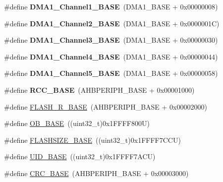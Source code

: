 \begin{DoxyCompactItemize}
\#define {\bfseries D\+M\+A1\+\_\+\+Channel1\+\_\+\+B\+A\+SE}~(D\+M\+A1\+\_\+\+B\+A\+SE + 0x00000008)
\item 
\mbox{\label{group___peripheral__memory__map_ga38a70090eef3687e83fa6ac0c6d22267}} 
\#define {\bfseries D\+M\+A1\+\_\+\+Channel2\+\_\+\+B\+A\+SE}~(D\+M\+A1\+\_\+\+B\+A\+SE + 0x0000001\+C)
\item 
\mbox{\label{group___peripheral__memory__map_ga70b3d9f36ca9ce95b4e421c11154fe5d}} 
\#define {\bfseries D\+M\+A1\+\_\+\+Channel3\+\_\+\+B\+A\+SE}~(D\+M\+A1\+\_\+\+B\+A\+SE + 0x00000030)
\item 
\mbox{\label{group___peripheral__memory__map_ga1adc93cd0baf0897202c71110e045692}} 
\#define {\bfseries D\+M\+A1\+\_\+\+Channel4\+\_\+\+B\+A\+SE}~(D\+M\+A1\+\_\+\+B\+A\+SE + 0x00000044)
\item 
\mbox{\label{group___peripheral__memory__map_gac041a71cd6c1973964f847a68aa14478}} 
\#define {\bfseries D\+M\+A1\+\_\+\+Channel5\+\_\+\+B\+A\+SE}~(D\+M\+A1\+\_\+\+B\+A\+SE + 0x00000058)
\item 
\mbox{\label{group___peripheral__memory__map_ga0e681b03f364532055d88f63fec0d99d}} 
\#define {\bfseries R\+C\+C\+\_\+\+B\+A\+SE}~(A\+H\+B\+P\+E\+R\+I\+P\+H\+\_\+\+B\+A\+SE + 0x00001000)
\item 
\#define \hyperlink{group___peripheral__memory__map_ga8e21f4845015730c5731763169ec0e9b}{F\+L\+A\+S\+H\+\_\+\+R\+\_\+\+B\+A\+SE}~(A\+H\+B\+P\+E\+R\+I\+P\+H\+\_\+\+B\+A\+SE + 0x00002000)
\item 
\#define \hyperlink{group___peripheral__memory__map_gab5b5fb155f9ee15dfb6d757da1adc926}{O\+B\+\_\+\+B\+A\+SE}~((uint32\+\_\+t)0x1\+F\+F\+F\+F800\+U)
\item 
\#define \hyperlink{group___peripheral__memory__map_ga776d985f2d4d40b588ef6ca9d573af78}{F\+L\+A\+S\+H\+S\+I\+Z\+E\+\_\+\+B\+A\+SE}~((uint32\+\_\+t)0x1\+F\+F\+F\+F7\+C\+C\+U)
\item 
\#define \hyperlink{group___peripheral__memory__map_ga664eda42b83c919b153b07b23348be67}{U\+I\+D\+\_\+\+B\+A\+SE}~((uint32\+\_\+t)0x1\+F\+F\+F\+F7\+A\+C\+U)
\item 
\#define \hyperlink{group___peripheral__memory__map_ga656a447589e785594cbf2f45c835ad7e}{C\+R\+C\+\_\+\+B\+A\+SE}~(A\+H\+B\+P\+E\+R\+I\+P\+H\+\_\+\+B\+A\+SE + 0x00003000)

\end{DoxyCompactItemize}
